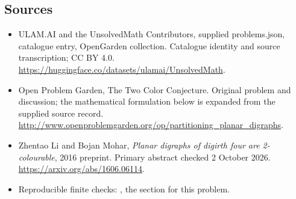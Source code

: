 \documentclass[11pt,a4paper]{article}
\begin{document}
\subsection{Sources}
\begin{itemize}
\item[S1] ULAM.AI and the UnsolvedMath Contributors, supplied problems.json, catalogue entry, OpenGarden collection. Catalogue identity and source transcription; CC BY 4.0.
\url{https://huggingface.co/datasets/ulamai/UnsolvedMath}.
\item[S2] Open Problem Garden, The Two Color Conjecture. Original problem and discussion; the mathematical formulation below is expanded from the supplied source record.
\url{http://www.openproblemgarden.org/op/partitioning_planar_digraphs}.

\item[R1] Zhentao Li and Bojan Mohar, \emph{Planar digraphs of digirth
four are 2-colourable}, 2016 preprint. Primary abstract checked
2 October 2026. \url{https://arxiv.org/abs/1606.06114}.
\item[R2] Reproducible finite checks:
, the section for this problem.

\end{itemize}
\end{document}
